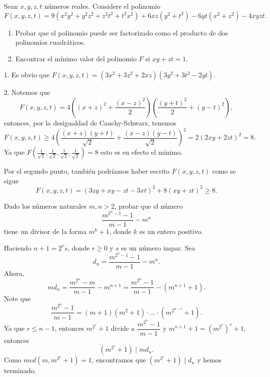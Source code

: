 \begin{example}
    Sean $x, y, z, t$ números reales.
    Considere el polinomio
    \[
        F(x,y,z,t) = 9 (x^2 y^2 + y^2 z^2 + z^2 t^2 + t^2 x^2) + 6xz (y^2 + t^2) - 6yt(x^2 + z^2) - 4xyzt.
    \]
    \begin{enumerate}
        \item Probar que el polinomio puede ser factorizado como el producto de dos polinomios cuadráticos.
        \item Encontrar el mínimo valor del polinomio $F$ si $xy + zt = 1$.
    \end{enumerate}
\end{example}
\begin{solution}
    1. Es obvio que $F(x, y, z, t) = (3x^2 + 3z^2 + 2xz)(3y^2 + 3t^2 - 2yt).$

    2. Notemos que
    \[
        F(x, y, z, t) = 4 \left((x + z)^2 + \frac{(x - z)^2}{2}\right)\left(\frac{(y + t)^2}{2} + (y - t)^2\right),
    \]
    entonces, por la desigualdad de Cauchy-Schwarz, tenemos
    \[
        F(x, y, z, t) \geq 4 \left( \frac{(x + z)(y + t)}{\sqrt {2}} + \frac{(x - z)(y - t)}{\sqrt {2}} \right)^2 = 2(2xy + 2zt)^2 = 8.
    \]
    Ya que $F\left(\frac{1}{\sqrt {2}}, \frac{1}{\sqrt {2}}, \frac{1}{\sqrt {2}}, \frac{1}{\sqrt {2}}\right) = 8$ esto es en efecto el mínimo.
\end{solution}

\begin{note}
    Por el segundo punto, también podríamos haber escrito $F(x, y, z, t)$ como se sigue
    \[
        F(x, y, z, t) = (3zy + xy - zt - 3xt)^2 + 8(xy + zt)^2 \geq 8.
    \]
\end{note}


\begin{example}
    Dado los números naturales $m,n > 2$, probar que el número
    \[
        \frac{m^{2^n - 1} - 1}{m - 1} - m^n
    \]
    tiene un divisor de la forma $m^k + 1$, donde $k$ es un entero positivo.
\end{example}
\begin{solution}
    Haciendo $n + 1 = 2^r s$, donde $r \geq 0$ y $s$ es un número impar.
    Sea
    \[
        d_n = \frac{m^{2^n - 1} - 1}{m - 1} - m^n.
    \]
    Ahora,
    \[
        m d_n = \frac{m^{2^n} - m}{m - 1} - m^{n + 1} = \frac{m^{2^n} - 1}{m - 1} - \left(m^{n + 1} + 1\right).
    \]
    Note que
    \[
        \frac{m^{2^n} - 1}{m - 1} = (m + 1)(m^2 + 1) \cdot \ldots \cdot (m^{2^{n - 1}} + 1).
    \]
    Ya que $r \leq n - 1$, entonces $m^{2^r} + 1$ divide a $\dfrac{m^{2^n} - 1}{m - 1}$ y $m^{n + 1} + 1 = (m^{2^r})^s + 1$, entonces
    \[
        (m^{2^r} + 1) \mid md_n.
    \]
    Como $mcd (m, m^{2^r} + 1) = 1$, encontramos que $(m^{2^r} + 1) \mid d_n$ y hemos terminado.
\end{solution}

